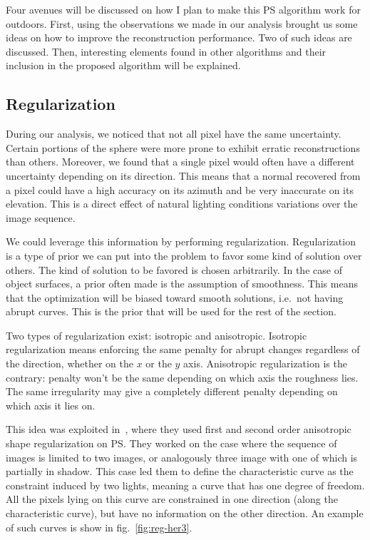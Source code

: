
Four avenues will be discussed on how I plan to make this PS algorithm work for outdoors. First, using the observations we made in our analysis brought us some ideas on how to improve the reconstruction performance. Two of such ideas are discussed. Then, interesting elements found in other algorithms and their inclusion in the proposed algorithm will be explained.

\subsection{Regularization}

During our analysis, we noticed that not all pixel have the same uncertainty. Certain portions of the sphere were more prone to exhibit erratic reconstructions than others. Moreover, we found that a single pixel would often have a different uncertainty depending on its direction. This means that a normal recovered from a pixel could have a high accuracy on its azimuth and be very inaccurate on its elevation. This is a direct effect of natural lighting conditions variations over the image sequence.

We could leverage this information by performing regularization. Regularization is a type of prior we can put into the problem to favor some kind of solution over others. The kind of solution to be favored is chosen arbitrarily. In the case of object surfaces, a prior often made is the assumption of smoothness. This means that the optimization will be biased toward smooth solutions, i.e.\ not having abrupt curves. This is the prior that will be used for the rest of the section.

Two types of regularization exist: isotropic and anisotropic. Isotropic regularization means enforcing the same penalty for abrupt changes regardless of the direction, whether on the $x$ or the $y$ axis. Anisotropic regularization is the contrary: penalty won't be the same depending on which axis the roughness lies. The same irregularity may give a completely different penalty depending on which axis it lies on.

This idea was exploited in~\cite{hernandez-pami-11}, where they used first and second order anisotropic shape regularization on PS. They worked on the case where the sequence of images is limited to two images, or analogously three image with one of which is partially in shadow. This case led them to define the characteristic curve as the constraint induced by two lights, meaning a curve that has one degree of freedom. All the pixels lying on this curve are constrained in one direction (along the characteristic curve), but have no information on the other direction. An example of such curves is show in fig.~\ref{fig:reg-her3}.

